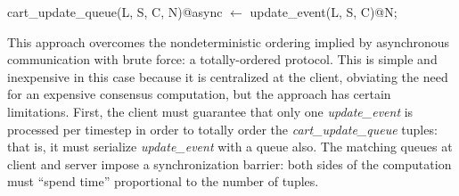 %

\begin{Dedalus}
cart_update_queue(L, S, C, N)@async \(\leftarrow\)
    update_event(L, S, C)@N;
\end{Dedalus}


This approach overcomes the nondeterministic ordering implied by asynchronous
communication with brute force: a totally-ordered protocol. This is simple and
inexpensive in this case because it is centralized at the client, obviating the
need for an expensive consensus computation, but the approach has certain
limitations.  First, the client must guarantee that only one {\em
update\_event} is processed per timestep in order to totally order the {\em
cart\_update\_queue} tuples: that is, it must serialize {\em update\_event}
with a queue also.  The matching queues at client and server impose a
synchronization barrier: both sides of the computation must ``spend time''
proportional to the number of tuples.


